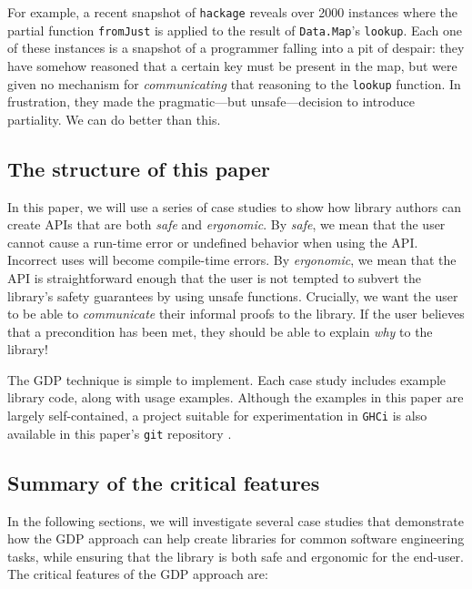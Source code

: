 \documentclass[format=sigplan, review=false, screen=true]{acmart}
\begin{document}
For example, a recent snapshot of \texttt{hackage}
reveals over 2000 instances where the partial function
\texttt{fromJust} is applied to the
result of \texttt{Data.Map}'s \texttt{lookup}. Each one
of these instances is a snapshot of a programmer
falling into a pit of despair:
they have somehow reasoned that a certain key must be
present in the map, but were given no mechanism for
\emph{communicating} that reasoning to the
\texttt{lookup} function. In frustration, they made the
pragmatic---but unsafe---decision to introduce partiality.
We can do better than this.


\subsection{The structure of this paper}
In this paper, we will use a series of case studies to show how library authors can create
APIs that are both \emph{safe} and \emph{ergonomic}. By \emph{safe}, we mean that the
user cannot cause a run-time error or undefined behavior when using the API. Incorrect uses
will become compile-time errors. By \emph{ergonomic}, we mean that the API is straightforward
enough that the user is not tempted to subvert the library's safety guarantees by using
unsafe functions. Crucially, we want the user to be able to \emph{communicate} their
informal proofs to the library. If the user believes that a precondition has been met,
they should be able to explain \emph{why} to the library!

The GDP technique is simple to implement. Each case study includes example library code, along with usage examples. Although the examples in this paper are largely self-contained, a
project suitable for experimentation in \texttt{GHCi} is also available in this paper's \texttt{git} repository \cite{this}.


\subsection{Summary of the critical features}
In the following sections, we will investigate several case studies that
demonstrate how the GDP approach can help create libraries for common
software engineering tasks, while ensuring that the library is both
safe and ergonomic for the end-user. The critical features of the GDP
approach are:
\end{document}
